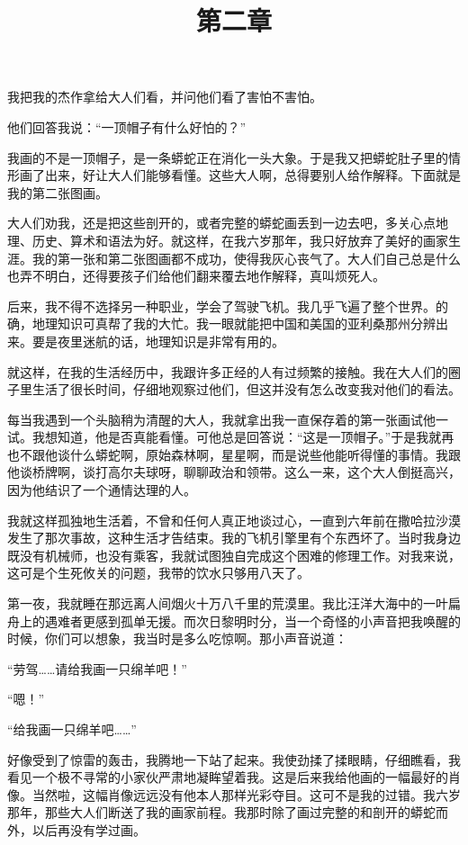 我把我的杰作拿给大人们看，并问他们看了害怕不害怕。

他们回答我说：“一顶帽子有什么好怕的？”

我画的不是一顶帽子，是一条蟒蛇正在消化一头大象。于是我又把蟒蛇肚子里的情形画了出来，好让大人们能够看懂。这些大人啊，总得要别人给作解释。下面就是我的第二张图画。

{\startalignment[center]
 \stopalignment}

大人们劝我，还是把这些剖开的，或者完整的蟒蛇画丢到一边去吧，多关心点地理、历史、算术和语法为好。就这样，在我六岁那年，我只好放弃了美好的画家生涯。我的第一张和第二张图画都不成功，使得我灰心丧气了。大人们自己总是什么也弄不明白，还得要孩子们给他们翻来覆去地作解释，真叫烦死人。

后来，我不得不选择另一种职业，学会了驾驶飞机。我几乎飞遍了整个世界。的确，地理知识可真帮了我的大忙。我一眼就能把中国和美国的亚利桑那州分辨出来。要是夜里迷航的话，地理知识是非常有用的。

就这样，在我的生活经历中，我跟许多正经的人有过频繁的接触。我在大人们的圈子里生活了很长时间，仔细地观察过他们，但这并没有怎么改变我对他们的看法。

每当我遇到一个头脑稍为清醒的大人，我就拿出我一直保存着的第一张画试他一试。我想知道，他是否真能看懂。可他总是回答说：“这是一顶帽子。”于是我就再也不跟他谈什么蟒蛇啊，原始森林啊，星星啊，而是说些他能听得懂的事情。我跟他谈桥牌啊，谈打高尔夫球呀，聊聊政治和领带。这么一来，这个大人倒挺高兴，因为他结识了一个通情达理的人。

\title{第二章}

我就这样孤独地生活着，不曾和任何人真正地谈过心，一直到六年前在撒哈拉沙漠发生了那次事故，这种生活才告结束。我的飞机引擎里有个东西坏了。当时我身边既没有机械师，也没有乘客，我就试图独自完成这个困难的修理工作。对我来说，这可是个生死攸关的问题，我带的饮水只够用八天了。

第一夜，我就睡在那远离人间烟火十万八千里的荒漠里。我比汪洋大海中的一叶扁舟上的遇难者更感到孤单无援。而次日黎明时分，当一个奇怪的小声音把我唤醒的时候，你们可以想象，我当时是多么吃惊啊。那小声音说道：

“劳驾\ldots{}\ldots{}请给我画一只绵羊吧！”

“嗯！”

“给我画一只绵羊吧\ldots{}\ldots{}”

好像受到了惊雷的轰击，我腾地一下站了起来。我使劲揉了揉眼睛，仔细瞧看，我看见一个极不寻常的小家伙严肃地凝眸望着我。这是后来我给他画的一幅最好的肖像。当然啦，这幅肖像远远没有他本人那样光彩夺目。这可不是我的过错。我六岁那年，那些大人们断送了我的画家前程。我那时除了画过完整的和剖开的蟒蛇而外，以后再没有学过画。

